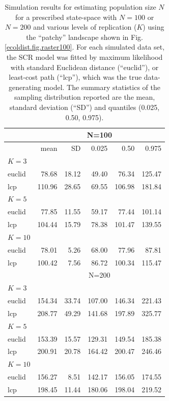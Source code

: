 \begin{table}[htp]
\label{tab.results1}
{\small
\caption{
Simulation results for estimating population size $N$ for a prescribed state-space with
$N=100$ or $N=200$ and various levels of replication ($K$)
using the ``patchy'' landscape shown in Fig.
 \ref{ecoldist.fig.raster100}.
For each simulated
data set, the SCR model was fitted by maximum likelihood with
standard Euclidean distance (``euclid''), or least-cost path
(``lcp''), which was the true data-generating model.
The summary statistics of the
sampling distribution reported are the mean, standard deviation
(``SD'') and quantiles (0.025, 0.50, 0.975).
}
\begin{tabular}{l|rrrrr}
  \hline
       & \multicolumn{5}{c}{N=100  }               \\ \hline
       & mean   & SD    & 0.025  & 0.50   & 0.975  \\ \hline
$K=3$  &        &       &        &        &        \\
euclid & 78.68  & 18.12 & 49.40  & 76.34  & 125.47 \\
lcp    & 110.96 & 28.65 & 69.55  & 106.98 & 181.84 \\
$K=5$  &        &       &        &        &        \\
euclid & 77.85  & 11.55 & 59.17  & 77.44  & 101.14 \\
lcp    & 104.44 & 15.79 & 78.38  & 101.47 & 139.55 \\
$K=10$ &        &       &        &        &        \\
euclid & 78.01  & 5.26  & 68.00  & 77.96  & 87.81  \\
lcp    & 100.42 & 7.56  & 86.72  & 100.34 & 115.47 \\ \hline
       & \multicolumn{5}{c}{N=200   }              \\ \hline
$K=3$  &        &       &        &        &        \\
euclid & 154.34 & 33.74 & 107.00 & 146.34 & 221.43 \\
lcp    & 208.77 & 49.29 & 141.68 & 197.89 & 325.77 \\
$K=5$  &        &       &        &        &        \\
euclid & 153.39 & 15.57 & 129.31 & 149.54 & 185.38 \\
lcp    & 200.91 & 20.78 & 164.42 & 200.47 & 246.46 \\
$K=10$ &        &       &        &        &        \\
euclid & 156.27 & 8.51  & 142.17 & 156.05 & 174.55 \\
lcp    & 198.45 & 11.44 & 180.06 & 198.04 & 219.52 \\ \hline
\end{tabular}
}
\label{ecoldist.tab.simresults}
\end{table}














